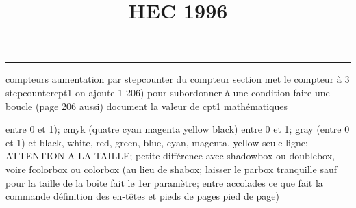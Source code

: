 \documentclass[11pt]{article}%
\title{\bf \vspace{-1cm} HEC 1996} %
\author{} %
\date{} %
\renewcommand{\headrulewidth}{0pt}%
\renewcommand{\footrulewidth}{0.4pt}%
\begin{document}
\maketitle %
\vspace{-1.2cm}\hrule %
\thispagestyle{fancy}

\vspace*{.4cm}


compteurs%
aumentation par stepcounter du compteur section%
met le compteur à 3%
stepcounter{cpt1} on ajoute 1%
206) pour subordonner à une condition %
faire une boucle (page 206 aussi) %
document la valeur de cpt1 
mathématiques\newcommand{\ch}{\operatorname{ch}} 
\newcommand{\sh}{\operatorname{sh}}
\renewcommand{\tanh}{\operatorname{th}}
\renewcommand{\sinh}{\operatorname{sh}}
\renewcommand{\cosh}{\operatorname{ch}}
\newcommand{\argsh}{\operatorname{argsh}}
\newcommand{\argch}{\operatorname{argch}}
\newcommand{\argth}{\operatorname{argth}}
\newcommand{\Id}{\operatorname{Id}}
\renewcommand{\leq}{\leq}
\renewcommand{\geq}{\geq }

\newcommand{\dlim}{\lim}
\newcommand{\dsum}{\sum}
\newcommand{\dprod}{\prod}



entre 0 et 1); cmyk (quatre cyan magenta yellow black) entre 0 et 1;
gray (entre 0 et 1) et black, white, red, green, blue, cyan, magenta,
yellow%
seule ligne; ATTENTION A LA TAILLE; petite différence avec shadowbox ou
doublebox, voire fcolorbox ou colorbox (au lieu de shabox; laisser le
parbox tranquille sauf pour la taille de la boîte
\newcommand{\Tbox}[1]{\begin{center} \shabox{\parbox{0.6
\linewidth}{#1}} \end{center}} %
fait le 1er paramètre; entre accolades ce que fait la commande
définition des en-têtes et pieds de pages\pagestyle{fancy}
\chead{}
\rfoot[ \ \thepage]{\thepage}
\cfoot{}
\lfoot{}
\thispagestyle{fancy} %
pied de page)\renewcommand{\footrulewidth}{0.4pt}
\renewcommand{\headrulewidth}{0.4pt}
\end{document}
